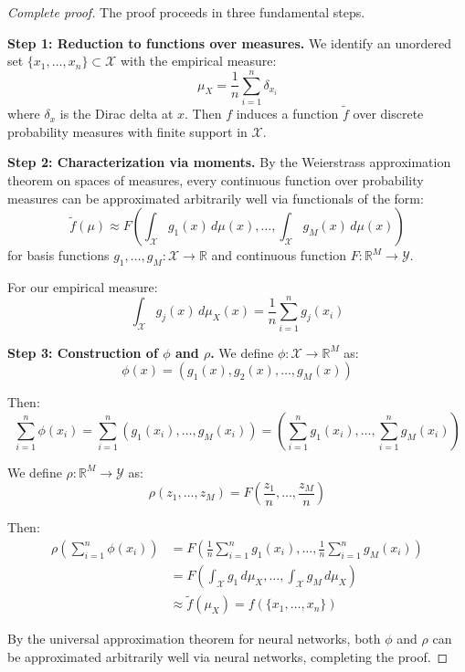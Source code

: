 \begin{proof}[Complete proof]
The proof proceeds in three fundamental steps.

\textbf{Step 1: Reduction to functions over measures.}
We identify an unordered set $\{x_1, \ldots, x_n\} \subset \mathcal{X}$ with the empirical measure:
\begin{equation}
\mu_X = \frac{1}{n}\sum_{i=1}^n \delta_{x_i}
\end{equation}
where $\delta_x$ is the Dirac delta at $x$. Then $f$ induces a function $\tilde{f}$ over discrete probability measures with finite support in $\mathcal{X}$.

\textbf{Step 2: Characterization via moments.}
By the Weierstrass approximation theorem on spaces of measures, every continuous function over probability measures can be approximated arbitrarily well via functionals of the form:
\begin{equation}
\tilde{f}(\mu) \approx F\left(\int_\mathcal{X} g_1(x)\, d\mu(x), \ldots, \int_\mathcal{X} g_M(x)\, d\mu(x)\right)
\end{equation}
for basis functions $g_1, \ldots, g_M: \mathcal{X} \to \mathbb{R}$ and continuous function $F: \mathbb{R}^M \to \mathcal{Y}$.

For our empirical measure:
\begin{equation}
\int_\mathcal{X} g_j(x)\, d\mu_X(x) = \frac{1}{n}\sum_{i=1}^n g_j(x_i)
\end{equation}

\textbf{Step 3: Construction of $\phi$ and $\rho$.}
We define $\phi: \mathcal{X} \to \mathbb{R}^M$ as:
\begin{equation}
\phi(x) = (g_1(x), g_2(x), \ldots, g_M(x))
\end{equation}

Then:
\begin{equation}
\sum_{i=1}^n \phi(x_i) = \sum_{i=1}^n (g_1(x_i), \ldots, g_M(x_i)) = \left(\sum_{i=1}^n g_1(x_i), \ldots, \sum_{i=1}^n g_M(x_i)\right)
\end{equation}

We define $\rho: \mathbb{R}^M \to \mathcal{Y}$ as:
\begin{equation}
\rho(z_1, \ldots, z_M) = F\left(\frac{z_1}{n}, \ldots, \frac{z_M}{n}\right)
\end{equation}

Then:
\begin{align}
\rho\left(\sum_{i=1}^n \phi(x_i)\right) &= F\left(\frac{1}{n}\sum_{i=1}^n g_1(x_i), \ldots, \frac{1}{n}\sum_{i=1}^n g_M(x_i)\right) \\
&= F\left(\int_\mathcal{X} g_1\, d\mu_X, \ldots, \int_\mathcal{X} g_M\, d\mu_X\right) \\
&\approx \tilde{f}(\mu_X) = f(\{x_1, \ldots, x_n\})
\end{align}

By the universal approximation theorem for neural networks, both $\phi$ and $\rho$ can be approximated arbitrarily well via neural networks, completing the proof.
\end{proof}

